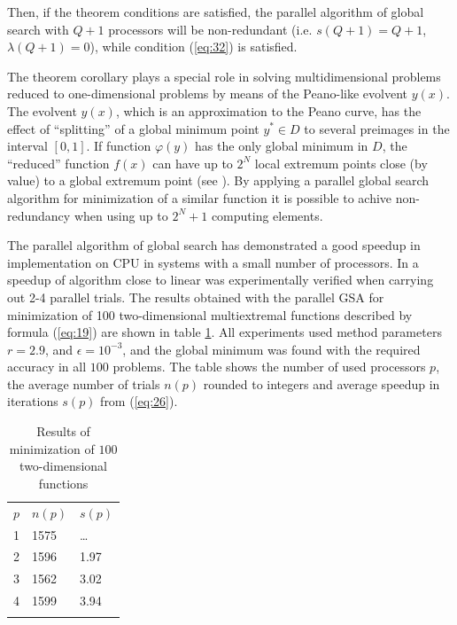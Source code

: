 \documentclass[smallcondensed]{svjour3}     %
\begin{document}
Then, if the theorem conditions are satisfied, the parallel algorithm of global search with $Q+1$ processors will be non-redundant (i.e. $s(Q+1)= Q+1$, \mbox{$\lambda(Q+1)=0$}), while condition (\ref{eq:32}) is satisfied.

The theorem corollary plays a special role in solving multidimensional problems reduced to one-dimensional problems by means of the Peano-like evolvent $y(x)$. The evolvent $y(x)$, which is an approximation to the Peano curve, has the effect of ``splitting'' of a global minimum point $y^\ast\in D$ to several preimages in the interval $[0,1]$. If function $\varphi(y)$ has the only global minimum in $D$, the ``reduced'' function $f(x)$ can have up to $2^N$ local extremum points close (by value) to a global extremum point (see \cite{RefStrongin2000}). By applying a parallel global search algorithm for minimization of a similar function it is possible to achive non-redundancy when using up to $2^N+1$ computing elements.

The parallel algorithm of global search has demonstrated a good speedup in implementation on CPU in systems with a small number of processors. In \cite{RefGrishagin1997,RefStrongin2003} a speedup of algorithm close to linear was experimentally verified when carrying out 2-4 parallel trials. The results obtained with the parallel GSA for minimization of 100 two-dimensional multiextremal functions described by formula (\ref{eq:19}) are shown in table \ref{tab:1}. All experiments used method parameters $r=2.9$, and $\epsilon=10^{-3}$, and the global minimum was found with the required accuracy in all $100$ problems. The table shows the number of used processors $p$, the average number of trials $n(p)$ rounded to integers and average speedup in iterations $s(p)$ from (\ref{eq:26}). 

\begin{table}
	\caption{Results of minimization of $100$ two-dimensional functions}
	\label{tab:1}
	\center
	\begin{tabular}{lll}
		\hline\noalign{\smallskip}
		 $p$ & $n(p)$ & $s(p)$ \\
		\noalign{\smallskip} \hline \noalign{\smallskip}
			1 &	1575 &	\dots \\
			2 &	1596 &	1.97 \\
			3 &	1562 &	3.02 \\
			4 &	1599 &	3.94 \\
		\noalign{\smallskip}\hline
	\end{tabular}
\end{table}
\end{document}
